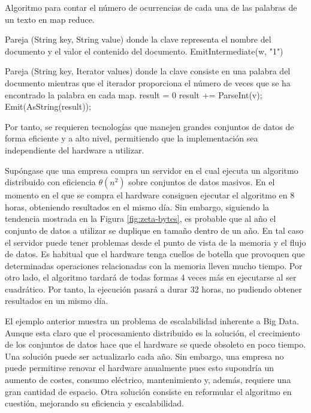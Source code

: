 \documentclass[10pt]{article}
\begin{document}
		\begin{algorithm}
			\caption{Algoritmo para contar el número de ocurrencias de cada una de las palabras de un texto en map reduce.}
			\label{alg:map}
			\begin{algorithmic}
				\REQUIRE Pareja (String key, String value) donde la clave representa el nombre del documento y el valor el contenido del documento.
				\STATE EmitIntermediate(w, "1")
				\ENDFOR
			\end{algorithmic}

			\begin{algorithmic}
				\REQUIRE Pareja (String key, Iterator values) donde la clave consiste en una palabra del documento mientras que el iterador proporciona el número de veces que se ha encontrado la palabra en cada map.
				\STATE result = 0
				\FOR{each value $v$ in  $values$}
				\STATE result += ParseInt(v);
				\ENDFOR
				\STATE Emit(AsString(result));
			\end{algorithmic}
		\end{algorithm}
		



		Por tanto, se requieren tecnologías que manejen grandes conjuntos de datos de forma eficiente y a alto nivel, permitiendo que la implementación sea independiente del hardware a utilizar.

		Supóngase que una empresa compra un servidor en el cual ejecuta un algoritmo distribuido con eficiencia $\theta(n^2)$ sobre conjuntos de datos masivos. En el momento en el que se compra el hardware consiguen ejecutar el algoritmo en 8 horas, obteniendo resultados en el mismo día. Sin embargo, siguiendo la tendencia mostrada en la Figura \ref{fig:zeta-bytes}, es probable que al año el conjunto de datos a utilizar se duplique en tamaño dentro de un año. En tal caso el servidor puede tener problemas desde el punto de vista de la memoria y el flujo de datos. Es habitual que el hardware tenga cuellos de botella que provoquen que determinadas operaciones relacionadas con la memoria lleven mucho tiempo.  Por otro lado, el algoritmo tardará de todas formas 4 veces más en ejecutarse al ser cuadrático. Por tanto, la ejecución pasará a durar 32 horas, no pudiendo obtener resultados en un mismo día. 
		
		El ejemplo anterior muestra un problema de escalabilidad inherente a Big Data. Aunque esta claro que el procesamiento distribuido es la solución, el crecimiento de los conjuntos de datos hace que el hardware se quede obsoleto en poco tiempo. Una solución puede ser actualizarlo cada año. Sin embargo, una empresa no puede permitirse renovar el hardware anualmente pues esto supondría un aumento de costes, consumo eléctrico, mantenimiento y, además, requiere una gran cantidad de espacio. Otra solución consiste en reformular el algoritmo en cuestión, mejorando su eficiencia y escalabilidad.
		
\end{document}
